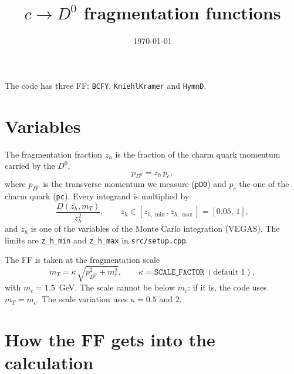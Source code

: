 \documentclass{article}
\title{$c\to D^0$ fragmentation functions}
\author{}
\date{\today}
\begin{document}
\begingroup\let\newpage\relax
\makeatletter\renewcommand\@maketitle{\begin{center}{\LARGE\@title\par}\vskip 0.5em{\large\@date\par}\end{center}\vskip 0.5em}\makeatother
\maketitle
\endgroup


The code has three FF: \texttt{BCFY},
\texttt{KniehlKramer} and \texttt{HymnD}.

\section{Variables}

The fragmentation fraction $z_h$ is the fraction of the charm quark momentum
carried by the $D^0$,
\begin{equation}
  p_{D^0} = z_h\,p_c ,
\end{equation}
where $p_{D^0}$ is the transverse momentum we measure (\texttt{pD0}) and $p_c$
the one of the charm quark (\texttt{pc}). Every integrand is multiplied by
\begin{equation}
  \frac{D(z_h, m_T)}{z_h^2}, \qquad z_h \in [z_{h,\min}, z_{h,\max}] = [0.05,\,1],
  \label{eq:weight}
\end{equation}
and $z_h$ is one of the variables of the Monte Carlo integration (VEGAS). The
limits are \texttt{z\_h\_min} and \texttt{z\_h\_max} in \texttt{src/setup.cpp}.

The FF is taken at the fragmentation scale
\begin{equation}
  m_T = \kappa\,\sqrt{p_{D^0}^2 + m_c^2}, \qquad \kappa = \texttt{SCALE\_FACTOR}\ (\text{default } 1),
\end{equation}
with $m_c = 1.5$~GeV. The scale cannot be below $m_c$: if it is, the code
uses $m_T = m_c$. The scale variation uses $\kappa = 0.5$ and $2$.

\section{How the FF gets into the calculation}
\end{document}

